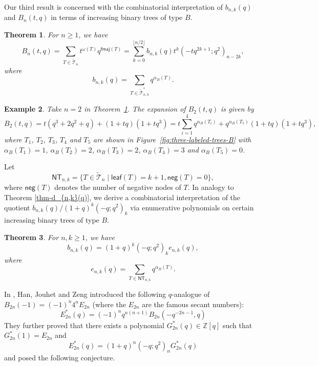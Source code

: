 \documentclass[12pt]{article}
\numberwithin{equation}{section}
\theoremstyle{plain}
\newtheorem{theorem}{Theorem}[section]
\newtheorem{example}[theorem]{Example}
\def\fmaj{\mathsf{fmaj}}
\def\NT{\mathsf{NT}}
\def\B{\mathcal{T}}
\def\leaf{\mathsf{leaf}}
\def\neg{\mathsf{neg}}
\begin{document}
	 Our third result is concerned with the combinatorial interpretation of  $b_{n,k}(q)$  and $B_{n}(t,q)$ in terms of increasing binary trees of type $B$.
	 	 \begin{theorem}\label{thm-gamma-B}
	 		For   $n\geq 1$, we have 
	 		\begin{equation}\label{eq-gamma-2}
	 			B_n(t,q)=\sum\limits_{T\in \widetilde{\B}_n}t^{\omega(T)}q^{\fmaj(T)}=\sum\limits_{k=0}^{\lfloor {n/2}\rfloor}  
	 			b_{n, k}(q)t^{k}(-tq^{2k+1}; q^2)_{n-2k},
	 		\end{equation}
	 		where 
	 		$$
	 		b_{n,k}(q)=\sum_{T\in \widetilde{\B}^*_{n,k}}q^{\alpha_B(T)}.
	 		$$
	 	\end{theorem}
	 		 \begin{example}
	 		Take $n=2$ in Theorem~\ref{thm-gamma-B}. The expansion of $B_2(t,q)$ is given by
	 		\[
	 		B_2(t,q)=t(q^3+2q^2+q)+(1+tq)(1+tq^3)=t\sum_{i=1}^4q^{\alpha_B(T_i)}+ q^{\alpha_B(T_5)}(1+tq)(1+tq^3),
	 		\]
	 		where $T_1$, $T_2$,  $T_3$, $T_4$ and $T_5$ are shown in Figure~\ref{fig:three-labeled-trees-B} with $\alpha_B(T_1)=1$, $\alpha_B(T_2)=2$,   $\alpha_B(T_3)=2$, $\alpha_B(T_4)=3$ and $\alpha_B(T_5)=0$.
	 	\end{example}
	 	
	 	
	 	
	 	Let 
	 	$$
	 	\NT_{n,k}=\{T\in \widetilde{\B}_{n}\mid \leaf(T)=k+1,  \neg(T)=0\},
	 	$$
	 	where $\neg(T)$ denotes the number of negative   nodes of $T$. 
	 		In analogy to Theorem \ref{thm-d_{n,k}(q)},  we derive a combinatorial interpretation of the quotient $ {b_{n,k}(q)/(1+q)^k(-q; q^2)_k}$ via enumerative polynomials on certain   increasing binary trees of type $B$.
	 	\begin{theorem}\label{thm-e_{n,k}(q)}
	 		For   $n,k\geq 1$, we have
	 		$$
	 		b_{n,k}(q)=(1+q)^k(-q; q^2)_ke_{n,k}(q) ,
	 		$$
	 		where 
	 		$$
	 		e_{n,k}(q)= \sum_{T\in \NT_{n,k}}q^{\alpha_B(T)}.
	 		$$
	 		
	 	\end{theorem}
	 	
	 	
	 	In \cite{HanJouhetZeng2013qtriangles},  Han, Jouhet and Zeng introduced the following   $q$-analogue of $B_{2n}(-1) = (-1)^n 4^n E_{2n}$ (where the $E_{2n}$ are the famous secant numbers): 
	 	\[
	 	E_{2n}^{*}(q)=(-1)^nq^{n(n+1)}
	 	B_{2n}(-q^{-2n-1},q)
	 	\]
	 	They further  proved that 
	 	there exists a polynomial $G^*_{2n}(q)\in\mathbb Z[q]$ such that $G^*_{2n}(1)=E_{2n}$ and
	 	\[
	 	E^*_{2n}(q)=   (1+q)^n  (-q; q^2)_{n} G^*_{2n}(q)
	 	\]
	 	  and posed the following conjecture.
	 	  
\end{document}
